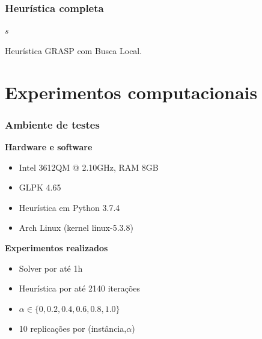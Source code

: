\documentclass[professionalfonts]{beamer}
\begin{document}
\begin{frame}
   \frametitle{Heurística completa}

   \begin{algorithm}[H]
      \footnotesize
      \Return $s$
      \caption{Heurística GRASP com Busca Local.}
      \label{algo:full}
   \end{algorithm}

\end{frame}

\section{Experimentos computacionais}

\begin{frame}
   \frametitle{Ambiente de testes}
   
   \textbf{Hardware e software}
   \begin{itemize}
      \item Intel 3612QM @ 2.10GHz, RAM 8GB
      \item GLPK 4.65
      \item Heurística em Python 3.7.4
      \item Arch Linux (kernel linux-5.3.8)
   \end{itemize}

   \medskip
   \textbf{Experimentos realizados}
   \begin{itemize}
      \item Solver por até 1h
      \item Heurística por até 2140 iterações
      \item $\alpha \in \{0, 0.2, 0.4, 0.6, 0.8, 1.0\}$
      \item 10 replicações por (instância,$\alpha$)
   \end{itemize}

\end{frame}
\end{document}
